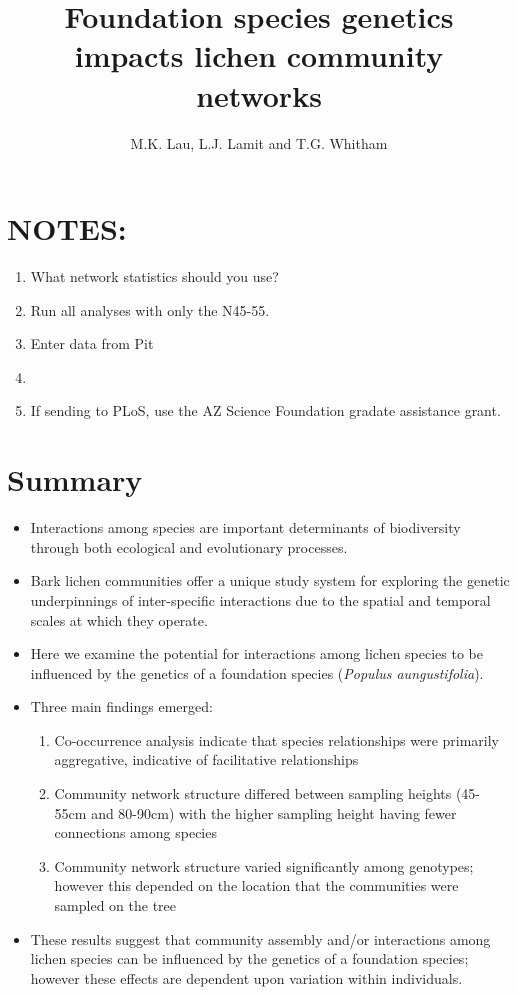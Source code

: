 \documentclass[11pt]{article}
\title{Foundation species genetics impacts lichen community networks}
\author{M.K. Lau, L.J. Lamit and T.G. Whitham}
\begin{document}
\maketitle

\section{NOTES:}
\begin{enumerate}
\item What network statistics should you use?
\item Run all analyses with only the N45-55.
\item Enter data from Pit
\item 
\item If sending to PLoS, use the AZ Science Foundation gradate assistance grant.
\end{enumerate}

\section{Summary}

\begin{itemize}
\item Interactions among species are important determinants of biodiversity through both ecological and evolutionary processes.
\item Bark lichen communities offer a unique study system for exploring the genetic underpinnings of inter-specific interactions due to the spatial and temporal scales at which they operate.
\item Here we examine the potential for interactions among lichen species to be influenced by the genetics of a foundation species (\textit{Populus aungustifolia}). 
\item Three main findings emerged:
	\begin{enumerate}
	\item Co-occurrence analysis indicate that species relationships were primarily aggregative, indicative of facilitative relationships
	\item Community network structure differed between sampling heights (45-55cm and 80-90cm) with the higher sampling height having fewer connections among species
	\item Community network structure varied significantly among genotypes; however this depended on the location that the communities were sampled on the tree
	\end{enumerate}
\item These results suggest that community assembly and/or interactions among lichen species can be influenced by the genetics of a foundation species; however these effects are dependent upon variation within individuals.
\end{itemize}
\end{document}
